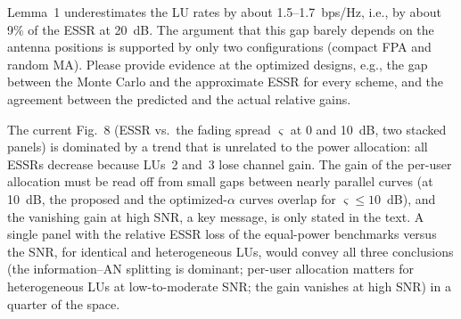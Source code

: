 \documentclass[10pt,a4paper]{article}
\begin{document}
\begin{description}[leftmargin=0pt]
\item[M5 (Impact of the conservative LU-rate approximation).] Lemma~1 underestimates the LU rates by about 1.5--1.7~bps/Hz, i.e., by about 9\% of the ESSR at 20~dB. The argument that this gap barely depends on the antenna positions is supported by only two configurations (compact FPA and random MA). Please provide evidence at the optimized designs, e.g., the gap between the Monte Carlo and the approximate ESSR for every scheme, and the agreement between the predicted and the actual relative gains.

\item[M6 (Design of the power-allocation figure).] The current Fig.~8 (ESSR vs.\ the fading spread $\varsigma$ at 0 and 10~dB, two stacked panels) is dominated by a trend that is unrelated to the power allocation: all ESSRs decrease because LUs~2 and~3 lose channel gain. The gain of the per-user allocation must be read off from small gaps between nearly parallel curves (at 10~dB, the proposed and the optimized-$\alpha$ curves overlap for $\varsigma\le10$~dB), and the vanishing gain at high SNR, a key message, is only stated in the text. A single panel with the relative ESSR loss of the equal-power benchmarks versus the SNR, for identical and heterogeneous LUs, would convey all three conclusions (the information--AN splitting is dominant; per-user allocation matters for heterogeneous LUs at low-to-moderate SNR; the gain vanishes at high SNR) in a quarter of the space.
\end{description}
\end{document}
